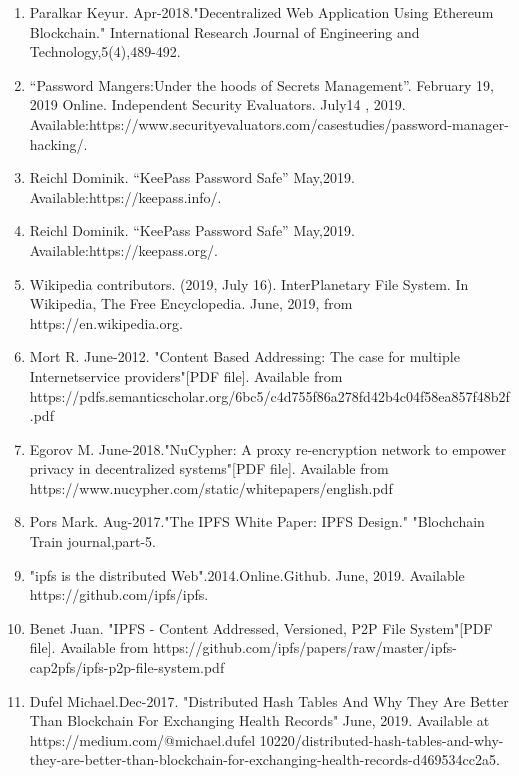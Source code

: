 \documentclass[12pt]{article}
\begin{document}
\begin{enumerate}

\item  Paralkar Keyur. Apr-2018."Decentralized Web Application Using Ethereum Blockchain."
       International Research Journal of Engineering and Technology,5(4),489-492.
       
\item “Password Mangers:Under the hoods of Secrets Management”. February 19, 2019 Online. Independent Security Evaluators. July14 , 2019. Available:https://www.securityevaluators.com/casestudies/password-manager-hacking/.

\item  Reichl Dominik. “KeePass Password Safe” May,2019. Available:https://keepass.info/.

\item  Reichl Dominik. “KeePass Password Safe” May,2019. Available:https://keepass.org/.


\item  Wikipedia contributors. (2019, July 16). InterPlanetary File System. In Wikipedia, The Free Encyclopedia. June, 2019, from https://en.wikipedia.org.

\item Mort R. June-2012. "Content Based Addressing: 
The case for multiple  Internetservice providers"[PDF file].
Available from https://pdfs.semanticscholar.org/6bc5/c4d755f86a278fd42b4c04f58ea857f48b2f.pdf

\item Egorov M. June-2018."NuCypher: A proxy re-encryption network to empower privacy in decentralized systems"[PDF file].
Available from https://www.nucypher.com/static/whitepapers/english.pdf

\item Pors Mark. Aug-2017."The IPFS White Paper: IPFS Design."
"Blochchain Train journal,part-5.

\item "ipfs is the distributed Web".2014.Online.Github. June, 2019. Available https://github.com/ipfs/ipfs.

\item Benet Juan. "IPFS - Content Addressed, Versioned, P2P File System"[PDF file]. Available from https://github.com/ipfs/papers/raw/master/ipfs-cap2pfs/ipfs-p2p-file-system.pdf

\item Dufel Michael.Dec-2017. "Distributed Hash Tables And Why They Are Better Than Blockchain For Exchanging Health Records" June, 2019.
Available at https://medium.com/@michael.dufel 10220/distributed-hash-tables-and-why-they-are-better-than-blockchain-for-exchanging-health-records-d469534cc2a5.


\end{enumerate}
\end{document}
